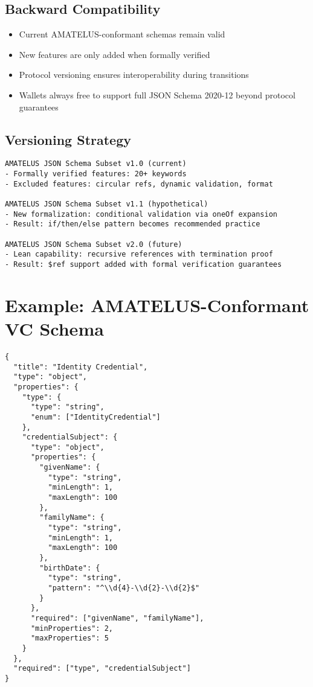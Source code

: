 \subsection{Backward Compatibility}

\begin{itemize}
  \item Current AMATELUS-conformant schemas remain valid
  \item New features are only added when formally verified
  \item Protocol versioning ensures interoperability during transitions
  \item Wallets always free to support full JSON Schema 2020-12 beyond protocol guarantees
\end{itemize}

\subsection{Versioning Strategy}

\begin{verbatim}
AMATELUS JSON Schema Subset v1.0 (current)
- Formally verified features: 20+ keywords
- Excluded features: circular refs, dynamic validation, format

AMATELUS JSON Schema Subset v1.1 (hypothetical)
- New formalization: conditional validation via oneOf expansion
- Result: if/then/else pattern becomes recommended practice

AMATELUS JSON Schema Subset v2.0 (future)
- Lean capability: recursive references with termination proof
- Result: $ref support added with formal verification guarantees
\end{verbatim}

\section{Example: AMATELUS-Conformant VC Schema}

\begin{verbatim}
{
  "title": "Identity Credential",
  "type": "object",
  "properties": {
    "type": {
      "type": "string",
      "enum": ["IdentityCredential"]
    },
    "credentialSubject": {
      "type": "object",
      "properties": {
        "givenName": {
          "type": "string",
          "minLength": 1,
          "maxLength": 100
        },
        "familyName": {
          "type": "string",
          "minLength": 1,
          "maxLength": 100
        },
        "birthDate": {
          "type": "string",
          "pattern": "^\\d{4}-\\d{2}-\\d{2}$"
        }
      },
      "required": ["givenName", "familyName"],
      "minProperties": 2,
      "maxProperties": 5
    }
  },
  "required": ["type", "credentialSubject"]
}
\end{verbatim}

